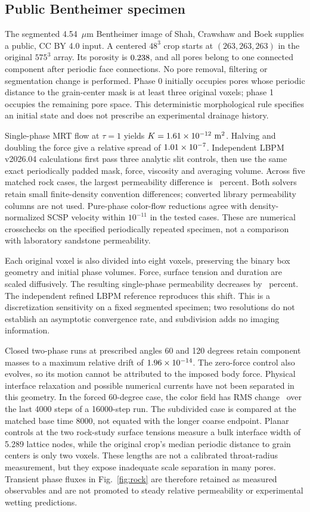 \subsection{Public Bentheimer specimen}
The segmented 4.54~$\mu$m Bentheimer image of Shah, Crawshaw and Boek
\cite{shah2014} supplies a public, CC BY 4.0 input. A centered
$48^3$ crop starts at $(263,263,263)$ in the original $575^3$ array.
Its porosity is $0.238$, and all pores belong to one connected
component after periodic face connections. No pore removal, filtering or
segmentation change is performed. Phase 0 initially occupies pores whose
periodic distance to the grain-center mask is at least three original
voxels; phase 1 occupies the remaining pore space. This deterministic
morphological rule specifies an initial state and does not prescribe an
experimental drainage history.

Single-phase MRT flow at $\tau=1$ yields
$K=1.61\times10^{-12}\ \mathrm{m}^2$. Halving and doubling the force give a relative
spread of $1.01\times10^{-7}$. Independent LBPM v2026.04 calculations first
pass three analytic slit controls, then use the same exact periodically
padded mask, force, viscosity and averaging volume. Across five matched
rock cases, the largest permeability difference is
\RockReferenceDifference\ percent. Both solvers retain small finite-density
convention differences; converted library permeability columns are not used.
Pure-phase color-flow reductions agree with density-normalized SCSP velocity
within $10^{-11}$ in the tested cases. These are numerical crosschecks on
the specified periodically repeated specimen, not a comparison with
laboratory sandstone permeability.

Each original voxel is also divided into eight voxels, preserving the
binary box geometry and initial phase volumes. Force, surface tension and
duration are scaled diffusively. The resulting single-phase permeability
decreases by \RefinedKChange\ percent. The independent refined LBPM reference
reproduces this shift. This is a discretization sensitivity
on a fixed segmented specimen; two resolutions do not establish an
asymptotic convergence rate, and subdivision adds no imaging information.

Closed two-phase runs at prescribed angles 60 and 120 degrees retain
component masses to a maximum relative drift of $1.96\times10^{-14}$.
The zero-force control also evolves, so its motion cannot be attributed to
the imposed body force. Physical interface relaxation and possible numerical
currents have not been separated in this geometry. In the forced 60-degree case, the color
field has RMS change \RockLateColor\ over the last 4000 steps of a
16000-step run. The subdivided case is compared at the matched base time
8000, not equated with the longer coarse endpoint. Planar controls at the
two rock-study surface tensions measure a bulk interface width of 5.289
lattice nodes, while the original crop's median periodic
distance to grain centers is only two voxels. These lengths are not a
calibrated throat-radius measurement, but they expose inadequate scale
separation in many pores. Transient phase fluxes in Fig.~\ref{fig:rock} are
therefore retained as measured observables and are not promoted to steady
relative permeability or experimental wetting predictions.

